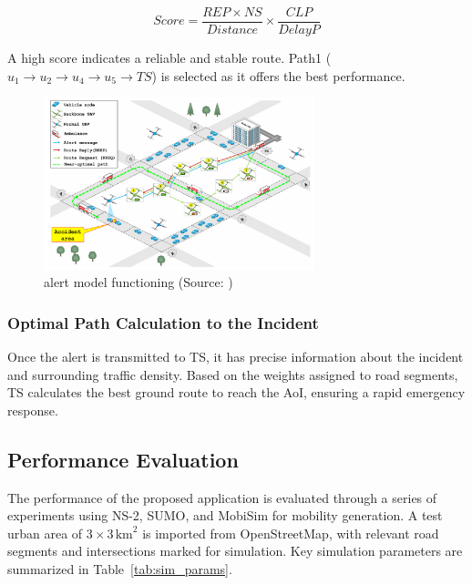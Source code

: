 \[
Score = \frac{REP \times NS}{Distance} \times \frac{CLP}{DelayP}
\]

A high score indicates a reliable and stable route. Path1 (\( u_1 \rightarrow u_2 \rightarrow u_4 \rightarrow u_5 \rightarrow TS \)) is selected as it offers the best performance.


\begin{figure}[H]
    \centering
    \includegraphics[width=0.7\textwidth]{Figures/Chapter3/Method5/4.png}
    \caption{alert model functioning (Source: \cite{oubbati2019leveraging})}
    \label{fig:Hello_packet_format}
\end{figure}

\subsubsection{Optimal Path Calculation to the Incident}
Once the alert is transmitted to TS, it has precise information about the incident and surrounding traffic density. Based on the weights assigned to road segments, TS calculates the best ground route to reach the AoI, ensuring a rapid emergency response.

\vspace{\baselineskip} %

\subsection{Performance Evaluation}
The performance of the proposed application is evaluated through a series of experiments using NS-2, SUMO, and MobiSim for mobility generation. A test urban area of \(3 \times 3 \, \text{km}^2\) is imported from OpenStreetMap, with relevant road segments and intersections marked for simulation. Key simulation parameters are summarized in Table~\ref{tab:sim_params}.


